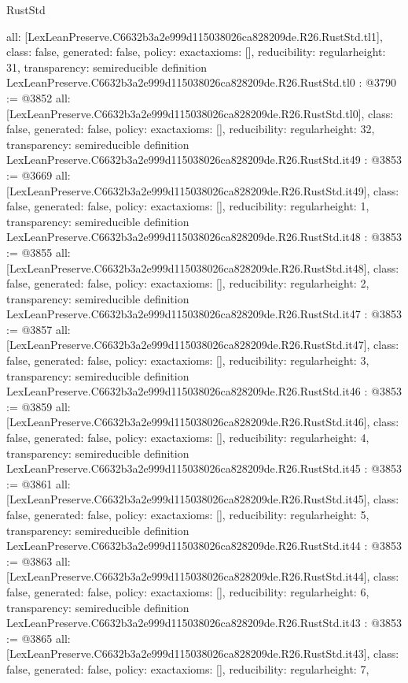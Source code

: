 \begin{lexlean}{RustStd}
\begin{coremodule}
{  all: [LexLeanPreserve.C6632b3a2e999d115038026ca828209de.R26.RustStd.tl1],
  class: false,
  generated: false,
  policy: exact{axioms: []},
  reducibility: regular{height: 31},
  transparency: semireducible
}
definition LexLeanPreserve.C6632b3a2e999d115038026ca828209de.R26.RustStd.tl0 : @3790 := @3852 {
  all: [LexLeanPreserve.C6632b3a2e999d115038026ca828209de.R26.RustStd.tl0],
  class: false,
  generated: false,
  policy: exact{axioms: []},
  reducibility: regular{height: 32},
  transparency: semireducible
}
definition LexLeanPreserve.C6632b3a2e999d115038026ca828209de.R26.RustStd.it49 : @3853 := @3669 {
  all: [LexLeanPreserve.C6632b3a2e999d115038026ca828209de.R26.RustStd.it49],
  class: false,
  generated: false,
  policy: exact{axioms: []},
  reducibility: regular{height: 1},
  transparency: semireducible
}
definition LexLeanPreserve.C6632b3a2e999d115038026ca828209de.R26.RustStd.it48 : @3853 := @3855 {
  all: [LexLeanPreserve.C6632b3a2e999d115038026ca828209de.R26.RustStd.it48],
  class: false,
  generated: false,
  policy: exact{axioms: []},
  reducibility: regular{height: 2},
  transparency: semireducible
}
definition LexLeanPreserve.C6632b3a2e999d115038026ca828209de.R26.RustStd.it47 : @3853 := @3857 {
  all: [LexLeanPreserve.C6632b3a2e999d115038026ca828209de.R26.RustStd.it47],
  class: false,
  generated: false,
  policy: exact{axioms: []},
  reducibility: regular{height: 3},
  transparency: semireducible
}
definition LexLeanPreserve.C6632b3a2e999d115038026ca828209de.R26.RustStd.it46 : @3853 := @3859 {
  all: [LexLeanPreserve.C6632b3a2e999d115038026ca828209de.R26.RustStd.it46],
  class: false,
  generated: false,
  policy: exact{axioms: []},
  reducibility: regular{height: 4},
  transparency: semireducible
}
definition LexLeanPreserve.C6632b3a2e999d115038026ca828209de.R26.RustStd.it45 : @3853 := @3861 {
  all: [LexLeanPreserve.C6632b3a2e999d115038026ca828209de.R26.RustStd.it45],
  class: false,
  generated: false,
  policy: exact{axioms: []},
  reducibility: regular{height: 5},
  transparency: semireducible
}
definition LexLeanPreserve.C6632b3a2e999d115038026ca828209de.R26.RustStd.it44 : @3853 := @3863 {
  all: [LexLeanPreserve.C6632b3a2e999d115038026ca828209de.R26.RustStd.it44],
  class: false,
  generated: false,
  policy: exact{axioms: []},
  reducibility: regular{height: 6},
  transparency: semireducible
}
definition LexLeanPreserve.C6632b3a2e999d115038026ca828209de.R26.RustStd.it43 : @3853 := @3865 {
  all: [LexLeanPreserve.C6632b3a2e999d115038026ca828209de.R26.RustStd.it43],
  class: false,
  generated: false,
  policy: exact{axioms: []},
  reducibility: regular{height: 7},
}
\end{coremodule}
\end{lexlean}
